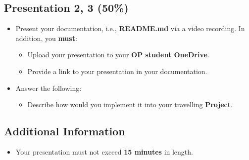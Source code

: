 \documentclass{article}
\begin{document}
\subsection*{Presentation 2, 3 (50\%)}
\begin{itemize}
	\item Present your documentation, i.e., \textbf{README.md} via a video recording. In addition, you \textbf{must}:
	      \begin{itemize}
		      \item Upload your presentation to your \textbf{OP student OneDrive}.
		      \item Provide a link to your presentation in your documentation.
	      \end{itemize}
	\item Answer the following:
	      \begin{itemize}
		      \item Describe how would you implement it into your travelling \textbf{Project}.
	      \end{itemize}
\end{itemize}

\subsection*{Additional Information}
\begin{itemize}
	\item Your presentation must not exceed \textbf{15 minutes} in length.
\end{itemize}
\end{document}
